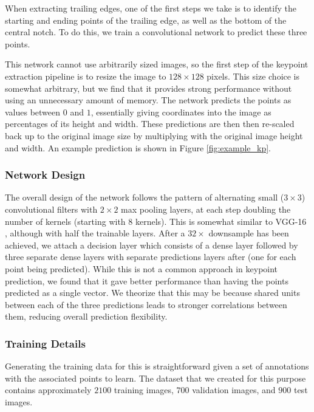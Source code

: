 When extracting trailing edges, one of the first steps we take is to identify the starting and ending points of the trailing edge, as well as the bottom of the central notch.
To do this, we train a convolutional network to predict these three points.

This network cannot use arbitrarily sized images, so the first step of the keypoint extraction pipeline is to resize the image to $128 \times 128$ pixels.
This size choice is somewhat arbitrary, but we find that it provides strong performance without using an unnecessary amount of memory.
The network predicts the points as values between $0$ and $1$, essentially giving coordinates into the image as percentages of its height and width. 
These predictions are then then re-scaled back up to the original image size by multiplying with the original image height and width.
An example prediction is shown in Figure \ref{fig:example_kp}.

\subsubsection{Network Design}

The overall design of the network follows the pattern of alternating small ($3 \times 3$) convolutional filters with $2 \times 2$ max pooling layers, at each step doubling the number of kernels (starting with $8$ kernels).
This is somewhat similar to VGG-16 \cite{simonyan2014very}, although with half the trainable layers.
After a $32\times$ downsample has been achieved, we attach a decision layer which consists of a dense layer followed by three separate dense layers with separate predictions layers after (one for each point being predicted).
While this is not a common approach in keypoint prediction, we found that it gave better performance than having the points predicted as a single vector.
We theorize that this may be because shared units between each of the three predictions leads to stronger correlations between them, reducing overall prediction flexibility.

\subsubsection{Training Details}

Generating the training data for this is straightforward given a set of annotations with the associated points to learn.
The dataset that we created for this purpose contains approximately $2100$ training images, $700$ validation images, and $900$ test images.

